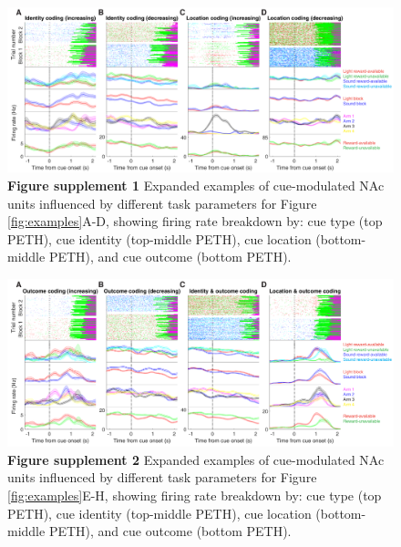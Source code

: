 \documentclass[11pt]{article}
\newcommand{\bsf}[1]{\textbf{#1}}
\begin{document}
 \begin{figure}[ht!]
\centering
\includegraphics[width=\textwidth]{Fig 4 - Neural examples SUPP1.pdf}
\caption*{\bsf{Figure supplement 1} Expanded examples of cue-modulated NAc units influenced by different
  task parameters for Figure \ref{fig:examples}A-D, showing firing rate breakdown by: cue type (top PETH), cue identity (top-middle PETH), cue location (bottom-middle PETH), and cue outcome (bottom PETH).}
\label{fig:examplesSUPP1}
\end{figure} \clearpage

 \begin{figure}[ht!]
\centering
\includegraphics[width=\textwidth]{Fig 4 - Neural examples SUPP2.pdf}
\caption*{\bsf{Figure supplement 2} Expanded examples of cue-modulated NAc units influenced by different
  task parameters for Figure \ref{fig:examples}E-H, showing firing rate breakdown by: cue type (top PETH), cue identity (top-middle PETH), cue location (bottom-middle PETH), and cue outcome (bottom PETH).}
\label{fig:examplesSUPP2}
\end{figure} \clearpage
\end{document}
